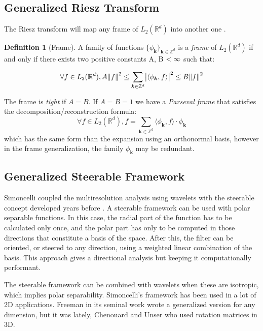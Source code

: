 \documentclass{InsightArticle}
\theoremstyle{definition}
\newtheorem{definition}{Definition}[section]
\begin{document}
\subsection{Generalized Riesz Transform}
The Riesz transform will map any frame of $L_2(\mathbb{R}^d)$ into another one \cite{held_steerable_2010, unser_wavelet_2010}.\\
\begin{definition}[Frame]
    A family of functions $\{\phi_{\bm{k}}\}_{ \bm{k}\in\mathbb{Z}^d}$ is a \textit{frame} of $L_2(\mathbb{R}^d)$ if and only if there exists two positive constants A, B $< \infty$ such that:

\begin{equation}
  \forall f \in L_2(\mathbb{R}^d), A\norm{f}^2 \le \sum_{\bm{k}\in\mathbb{Z}^d}\abs{\langle\phi_{\bm{k}},f\rangle}^2 \le B\norm{f}^2
\end{equation}

The frame is \textit{tight} if $A=B$. If $A=B=1$ we have a \textit{Parseval frame} that satisfies the decomposition/reconstruction formula:
\begin{equation}
  \forall f \in L_2(\mathbb{R}^d), f = \sum_{\bm{k}\in\mathbb{Z}^d}\langle\phi_{\bm{k}},f\rangle \cdot \phi_{\bm{k}}
\end{equation}
which has the same form than the expansion using an orthonormal basis, however in the frame generalization, the family $\phi_{\bm{k}}$ may be redundant.
\end{definition}

\subsection{Generalized Steerable Framework}
Simoncelli \cite{simoncelli_steerable_1995} coupled the multiresolution analysis using wavelets with the steerable concept developed years before \cite{freeman_design_1991}. A steerable framework can be used with polar separable functions. In this case, the radial part of the function has to be calculated only once, and the polar part has only to be computed in those directions that constitute a basis of the space. After this, the filter can be oriented, or steered to any direction, using a weighted linear combination of the basis. This approach gives a directional analysis but keeping it computationally performant.

The steerable framework can be combined with wavelets when these are isotropic, which implies polar separability.
Simoncelli's framework has been used in a lot of 2D applications. Freeman in its seminal work \cite{freeman_design_1991} wrote a generalized version for any dimension, but it was lately, Chenouard and Unser \cite{held_steerable_2010,unser_steerable_2011,chenouard_3d_2012} who used rotation matrices in 3D.
\end{document}
